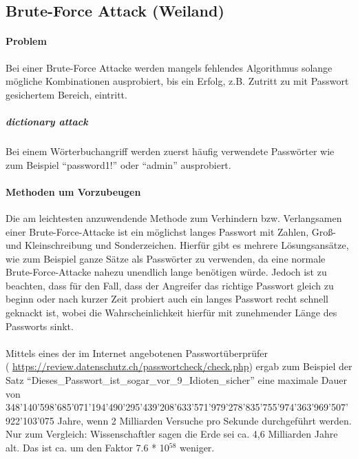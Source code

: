 \subsection{Brute-Force Attack (Weiland)}
\paragraph{Problem}
Bei einer Brute-Force Attacke werden mangels fehlendes Algorithmus solange mögliche Kombinationen ausprobiert, bis ein Erfolg, z.B. Zutritt zu mit Passwort gesichertem Bereich, eintritt.
\subparagraph{dictionary attack}
Bei einem Wörterbuchangriff werden zuerst häufig verwendete Passwörter wie zum Beispiel \enquote{password1!} oder \enquote{admin} ausprobiert. 
\paragraph{Methoden um Vorzubeugen}
Die am leichtesten anzuwendende Methode zum Verhindern bzw. Verlangsamen einer Brute-Force-Attacke ist ein möglichst langes Passwort mit Zahlen, Groß- und Kleinschreibung und Sonderzeichen. Hierfür gibt es mehrere Lösungsansätze, wie zum Beispiel ganze Sätze als Passwörter zu verwenden, da eine normale Brute-Force-Attacke nahezu unendlich lange benötigen würde. Jedoch ist zu beachten, dass für den Fall, dass der Angreifer das richtige Passwort gleich zu beginn oder nach kurzer Zeit probiert auch ein langes Passwort recht schnell geknackt ist, wobei die Wahrscheinlichkeit hierfür mit zunehmender Länge des Passworts sinkt.\\
\\
Mittels eines der im Internet angebotenen Passwortüberprüfer \\( \href{https://review.datenschutz.ch/passwortcheck/check.php}{https://review.datenschutz.ch/passwortcheck/check.php}) ergab zum Beispiel der Satz \enquote{Dieses\_Passwort\_ist\_sogar\_vor\_9\_Idioten\_sicher\!} eine maximale Dauer von\\ 348'140'598'685'071'194'490'295'439'208'633'571'979'278'835'755'974'363'969'507'922'103'075 Jahre, wenn 2 Milliarden Versuche pro Sekunde durchgeführt werden. Nur zum Vergleich: Wissenschaftler sagen die Erde sei ca. 4,6 Milliarden Jahre alt. Das ist ca. um den Faktor 7.6 * 10$^{58}$ weniger.
